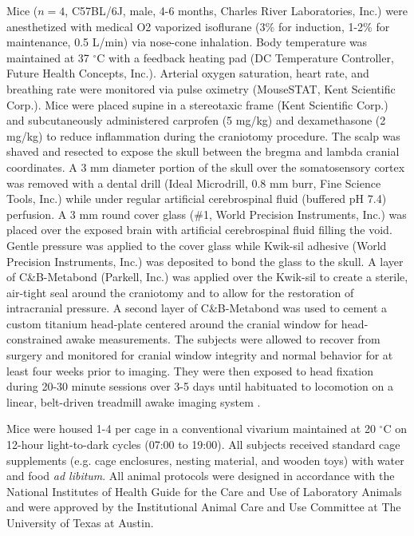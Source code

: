 \documentclass[12pt]{spieman}
\begin{document}
\begin{spacing}{2}
Mice ($n = 4$, C57BL/6J, male, 4-6 months, Charles River Laboratories, Inc.) were anesthetized with medical O2 vaporized isoflurane (3\% for induction, 1-2\% for maintenance, 0.5 L/min) via nose-cone inhalation. Body temperature was maintained at 37 $^\circ$C with a feedback heating pad (DC Temperature Controller, Future Health Concepts, Inc.). Arterial oxygen saturation, heart rate, and breathing rate were monitored via pulse oximetry (MouseSTAT, Kent Scientific Corp.). Mice were placed supine in a stereotaxic frame (Kent Scientific Corp.) and subcutaneously administered carprofen (5 mg/kg) and dexamethasone (2 mg/kg) to reduce inflammation during the craniotomy procedure. The scalp was shaved and resected to expose the skull between the bregma and lambda cranial coordinates. A 3 mm diameter portion of the skull over the somatosensory cortex was removed with a dental drill (Ideal Microdrill, 0.8 mm burr, Fine Science Tools, Inc.) while under regular artificial cerebrospinal fluid (buffered pH 7.4) perfusion. A 3 mm round cover glass (\#1, World Precision Instruments, Inc.) was placed over the exposed brain with artificial cerebrospinal fluid filling the void. Gentle pressure was applied to the cover glass while Kwik-sil adhesive (World Precision Instruments, Inc.) was deposited to bond the glass to the skull. A layer of C\&B-Metabond (Parkell, Inc.) was applied over the Kwik-sil to create a sterile, air-tight seal around the craniotomy and to allow for the restoration of intracranial pressure. A second layer of C\&B-Metabond was used to cement a custom titanium head-plate centered around the cranial window for head-constrained awake measurements. The subjects were allowed to recover from surgery and monitored for cranial window integrity and normal behavior for at least four weeks prior to imaging. They were then exposed to head fixation during 20-30 minute sessions over 3-5 days until habituated to locomotion on a linear, belt-driven treadmill awake imaging system \cite{He:2020}.

Mice were housed 1-4 per cage in a conventional vivarium maintained at 20 $^\circ$C on 12-hour light-to-dark cycles (07:00 to 19:00). All subjects received standard cage supplements (e.g. cage enclosures, nesting material, and wooden toys) with water and food \textit{ad libitum}. All animal protocols were designed in accordance with the National Institutes of Health Guide for the Care and Use of Laboratory Animals and were approved by the Institutional Animal Care and Use Committee at The University of Texas at Austin.


\end{spacing}
\end{document}
